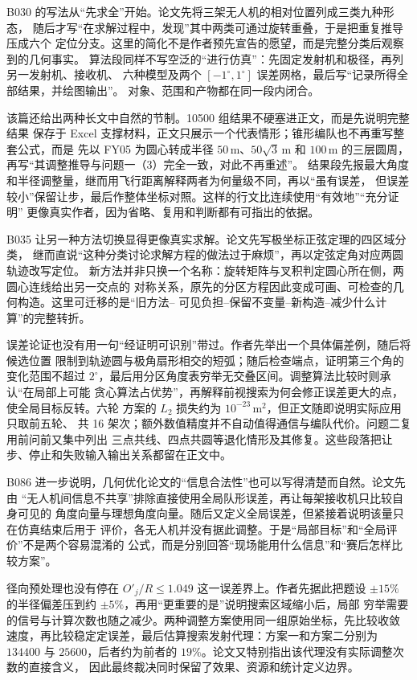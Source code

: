 B030 的写法从“先求全”开始。论文先将三架无人机的相对位置列成三类九种形态，
随后才写“在求解过程中，发现”其中两类可通过旋转重叠，于是把重复推导压成六个
定位分支。这里的简化不是作者预先宣告的愿望，而是完整分类后观察到的几何事实。
算法段同样不写空泛的“进行仿真”：先固定发射机和极径，再列另一发射机、接收机、
六种模型及两个 $[-1^\circ,1^\circ]$ 误差网格，最后写“记录所得全部结果，并绘图输出”。
对象、范围和产物都在同一段内闭合。

该篇还给出两种长文中自然的节制。10500 组结果不硬塞进正文，而是先说明完整结果
保存于 Excel 支撑材料，正文只展示一个代表情形；锥形编队也不再重写整套公式，而是
先以 FY05 为圆心转成半径 $50\,\mathrm{m}$、$50\sqrt{3}\,\mathrm{m}$ 和
$100\,\mathrm{m}$ 的三层圆周，再写“其调整推导与问题一（3）完全一致，对此不再重述”。
结果段先报最大角度和半径调整量，继而用飞行距离解释两者为何量级不同，再以“虽有误差，
但误差较小”保留让步，最后作整体坐标对照。这样的行文比连续使用“有效地”“充分证明”
更像真实作者，因为省略、复用和判断都有可指出的依据。

B035 让另一种方法切换显得更像真实求解。论文先写极坐标正弦定理的四区域分类，
继而直说“这种分类讨论求解方程的做法过于麻烦”，再以定弦定角对应两圆轨迹改写定位。
新方法并非只换一个名称：旋转矩阵与叉积判定圆心所在侧，两圆心连线给出另一交点的
对称关系，原先的分区方程因此变成可画、可检查的几何构造。这里可迁移的是“旧方法--
可见负担--保留不变量--新构造--减少什么计算”的完整转折。

误差论证也没有用一句“经证明可识别”带过。作者先举出一个具体偏差例，随后将候选位置
限制到轨迹圆与极角扇形相交的短弧；随后检查端点，证明第三个角的变化范围不超过
$2^\circ$，最后用分区角度表穷举无交叠区间。调整算法比较时则承认“在局部上可能
贪心算法占优势”，再解释前视搜索为何会修正误差更大的点，使全局目标反转。六轮
方案的 $L_2$ 损失约为 $10^{-23}\,\mathrm{m}^2$，但正文随即说明实际应用只取前五轮、
共 16 架次；额外数值精度并不自动值得通信与编队代价。问题二复用前问前又集中列出
三点共线、四点共圆等退化情形及其修复。这些段落把让步、停止和失败输入输出关系都留在正文中。

B086 进一步说明，几何优化论文的“信息合法性”也可以写得清楚而自然。论文先由
“无人机间信息不共享”排除直接使用全局队形误差，再让每架接收机只比较自身可见的
角度向量与理想角度向量。随后又定义全局误差，但紧接着说明该量只在仿真结束后用于
评价，各无人机并没有据此调整。于是“局部目标”和“全局评价”不是两个容易混淆的
公式，而是分别回答“现场能用什么信息”和“赛后怎样比较方案”。

径向预处理也没有停在 $O'_j/R\leq1.049$ 这一误差界上。作者先据此把题设
$\pm15\%$ 的半径偏差压到约 $\pm5\%$，再用“更重要的是”说明搜索区域缩小后，局部
穷举需要的信号与计算次数也随之减少。两种调整方案使用同一组原始坐标，先比较收敛
速度，再比较稳定定误差，最后估算搜索发射代理：方案一和方案二分别为 $134400$ 与
$25600$，后者约为前者的 $19\%$。论文又特别指出该代理没有实际调整次数的直接含义，
因此最终裁决同时保留了效果、资源和统计定义边界。


